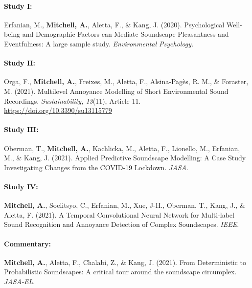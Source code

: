 \documentclass[twoside,fontsize=12pt,titlepage]{scrbook}
\begin{document}

\paragraph*{Study I:    }
Erfanian, M., \textbf{Mitchell, A.}, Aletta, F., \& Kang, J. (2020). Psychological Well-being and Demographic Factors can Mediate Soundscape Pleasantness and Eventfulness: A large sample study. \emph{Environmental Psychology}.

\paragraph*{Study II:   }
Orga, F., \textbf{Mitchell, A.}, Freixes, M., Aletta, F., Alsina-Pagès, R. M., \& Foraster, M. (2021). Multilevel Annoyance Modelling of Short Environmental Sound Recordings. \emph{Sustainability, 13}(11), Article 11. \url{https://doi.org/10.3390/su13115779}

\paragraph*{Study III:  }
Oberman, T., \textbf{Mitchell, A.}, Kachlicka, M., Aletta, F., Lionello, M., Erfanian, M., \& Kang, J. (2021). Applied Predictive Soundscape Modelling: A Case Study Investigating Changes from the COVID-19 Lockdown. \emph{JASA}.

\paragraph*{Study IV:   }
\textbf{Mitchell, A.}, Soelitsyo, C., Erfanian, M., Xue, J-H., Oberman, T., Kang, J., \& Aletta, F. (2021). A Temporal Convolutional Neural Network for Multi-label Sound Recognition and Annoyance Detection of Complex Soundscapes. \emph{IEEE}.

\paragraph*{Commentary: }
\textbf{Mitchell, A.}, Aletta, F., Chalabi, Z., \& Kang, J. (2021). From Deterministic to Probabilistic Soundscapes: A critical tour around the soundscape circumplex. \emph{JASA-EL}.
\end{document}
